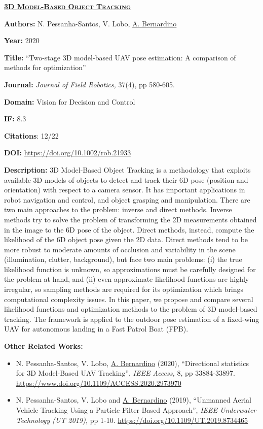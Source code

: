 \documentclass[
]{article}
\begin{document}
\textbf{\textsc{\ul{3D Model-Based Object Tracking}}}

\textbf{Authors:} N. Pessanha-Santos, V. Lobo, \ul{A. Bernardino}

\textbf{Year:} 2020

\textbf{Title:} ``Two-stage 3D model-based UAV pose estimation: A
comparison of methods for optimization''

\textbf{Journal:} \emph{Journal of Field Robotics,} 37(4), pp 580-605.

\textbf{Domain:} Vision for Decision and Control

\textbf{IF:} 8.3

\textbf{Citations}: 12/22

\textbf{DOI:} \url{https://doi.org/10.1002/rob.21933}~

\textbf{Description:} 3D Model-Based Object Tracking is a methodology
that exploits available 3D models of objects to detect and track their
6D pose (position and orientation) with respect to a camera sensor. It
has important applications in robot navigation and control, and object
grasping and manipulation. There are two main approaches to the problem:
inverse and direct methods. Inverse methods try to solve the problem of
transforming the 2D measurements obtained in the image to the 6D pose of
the object. Direct methods, instead, compute the likelihood of the 6D
object pose given the 2D data. Direct methods tend to be more robust to
moderate amounts of occlusion and variability in the scene
(illumination, clutter, background), but face two main problems: (i) the
true likelihood function is unknown, so approximations must be carefully
designed for the problem at hand, and (ii) even approximate likelihood
functions are highly irregular, so sampling methods are required for its
optimization which brings computational complexity issues. In this
paper, we propose and compare several likelihood functions and
optimization methods to the problem of 3D model-based tracking. The
framework is applied to the outdoor pose estimation of a fixed-wing UAV
for autonomous landing in a Fast Patrol Boat (FPB).

\textbf{Other Related Works:}

\begin{itemize}
\item
  N. Pessanha-Santos, V. Lobo, \ul{A. Bernardino} (2020), ``Directional
  statistics for 3D Model-Based UAV Tracking'', \emph{IEEE Access,} 8,
  pp 33884-33897. \url{https://www.doi.org/10.1109/ACCESS.2020.2973970}~
\item
  N. Pessanha-Santos, V. Lobo and \ul{A. Bernardino} (2019), ``Unmanned
  Aerial Vehicle Tracking Using a Particle Filter Based Approach'',
  \emph{IEEE Underwater Technology (UT 2019),} pp 1-10.
  \url{https://doi.org/10.1109/UT.2019.8734465}
\end{itemize}
\end{document}
